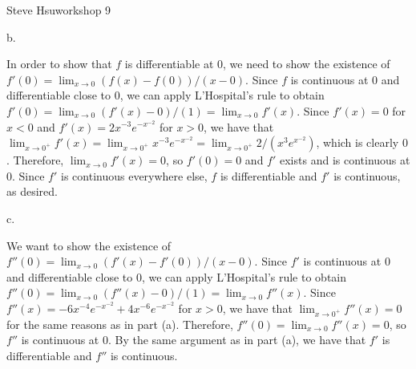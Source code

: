 \centerline{Steve Hsu\hfill workshop 9}
\item{b.}

In order to show that $f$ is differentiable at $0$, we need to show
the existence of $f'(0) = \lim _{x \to 0} (f(x) - f(0)) / (x - 0)$.
Since $f$ is continuous at $0$ and differentiable close to $0$,
we can apply L'Hospital's rule to obtain
$f'(0) = \lim _{x \to 0} (f'(x) - 0) / (1) = \lim _{x \to 0} f'(x)$.
Since $f'(x) = 0$ for $x < 0$ and $f'(x) = 2 x^{-3} e^{-x^{-2}}$ for $x > 0$,
we have that
$\lim _{x \to 0^+} f'(x) = \lim _{x \to 0^+} x^{-3} e^{-x^{-2}}
= \lim _{x \to 0^+} 2 / (x^3 e^{x^{-2}})$,
which is clearly $0$.
Therefore, $\lim _{x \to 0} f'(x) = 0$, so $f'(0) = 0$
and $f'$ exists and is continuous at $0$.
Since $f'$ is continuous everywhere else,
$f$ is differentiable and $f'$ is continuous, as desired.
\bigskip
\item{} c.

We want to show the existence of
$f''(0) = \lim _{x \to 0} (f'(x) - f'(0)) / (x - 0)$.
Since $f'$ is continuous at $0$ and differentiable close to $0$,
we can apply L'Hospital's rule to obtain
$f''(0) = \lim _{x \to 0} (f''(x) - 0) / (1) = \lim _{x \to 0} f''(x)$.
Since $f''(x) = -6 x^{-4} e^{-x^{-2}} + 4 x^{-6} e^{-x^{-2}}$ for $x > 0$,
we have that $\lim _{x \to 0^+} f''(x) = 0$
for the same reasons as in part (a).
Therefore, $f''(0) = \lim _{x \to 0} f''(x) = 0$,
so $f''$ is continuous at $0$.
By the same argument as in part (a),
we have that $f'$ is differentiable and $f''$ is continuous.
\bye
